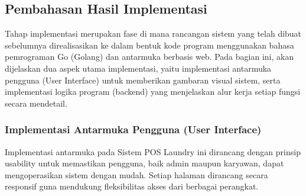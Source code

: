 
\vspace{1cm}
\subsection{Pembahasan Hasil Implementasi}
\indent
Tahap implementasi merupakan fase di mana rancangan sistem yang telah dibuat sebelumnya direalisasikan ke dalam bentuk kode program menggunakan bahasa pemrograman Go (Golang) dan antarmuka berbasis web. Pada bagian ini, akan dijelaskan dua aspek utama implementasi, yaitu implementasi antarmuka pengguna (User Interface) untuk memberikan gambaran visual sistem, serta implementasi logika program (backend) yang menjelaskan alur kerja setiap fungsi secara mendetail.



\subsubsection{Implementasi Antarmuka Pengguna (User Interface)}
\indent
Implementasi antarmuka pada Sistem POS Laundry ini dirancang dengan prinsip usability untuk memastikan pengguna, baik admin maupun karyawan, dapat mengoperasikan sistem dengan mudah. Setiap halaman dirancang secara responsif guna mendukung fleksibilitas akses dari berbagai perangkat. 


